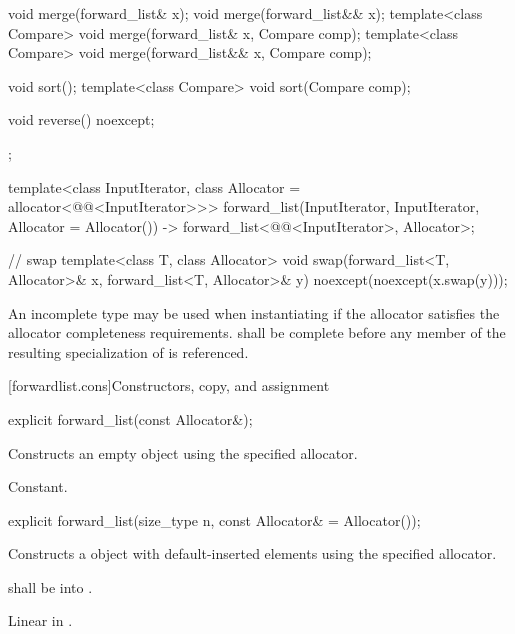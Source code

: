 \begin{codeblock}
{{    void merge(forward_list& x);
    void merge(forward_list&& x);
    template<class Compare> void merge(forward_list& x, Compare comp);
    template<class Compare> void merge(forward_list&& x, Compare comp);

    void sort();
    template<class Compare> void sort(Compare comp);

    void reverse() noexcept;
  };

  template<class InputIterator, class Allocator = allocator<@@<InputIterator>>>
    forward_list(InputIterator, InputIterator, Allocator = Allocator())
      -> forward_list<@@<InputIterator>, Allocator>;

  // swap
  template<class T, class Allocator>
    void swap(forward_list<T, Allocator>& x, forward_list<T, Allocator>& y)
      noexcept(noexcept(x.swap(y)));
}
\end{codeblock}

\pnum
An incomplete type  may be used when instantiating 
if the allocator satisfies the
allocator completeness requirements.
 shall be complete before any member of the resulting specialization
of  is referenced.

[forwardlist.cons]{Constructors, copy, and assignment}

%
\begin{itemdecl}
explicit forward_list(const Allocator&);
\end{itemdecl}

\begin{itemdescr}
\pnum
\effects Constructs an empty  object using the specified allocator.

\pnum
\complexity Constant.
\end{itemdescr}

%
\begin{itemdecl}
explicit forward_list(size_type n, const Allocator& = Allocator());
\end{itemdecl}

\begin{itemdescr}
\pnum
\effects Constructs a  object with 
default-inserted elements using the specified allocator.

\pnum
\requires {} shall be  into .

\pnum
\complexity Linear in .
\end{itemdescr}

